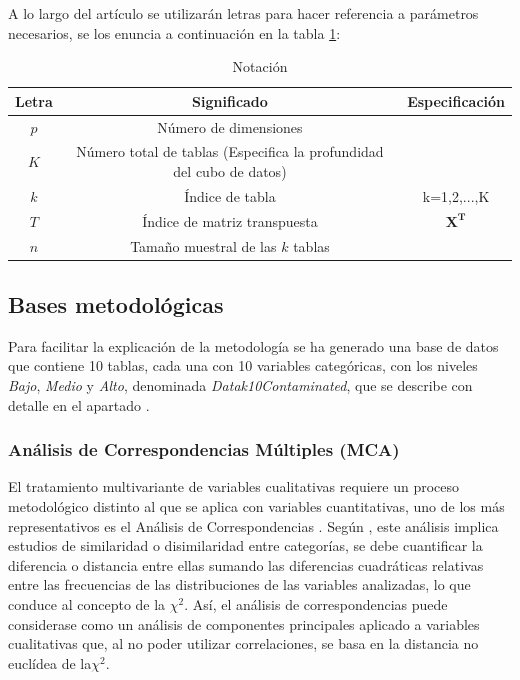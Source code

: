 \documentclass[mathematics,article,submit,moreauthors,pdftex]{mdpi}
\begin{document}
A lo largo del artículo se utilizarán letras para hacer referencia a
parámetros necesarios, se los enuncia a continuación en la tabla
\ref{tab:notacion2}:

\begin{table}[!ht]
\begin{center}
 \begin{tabular}{||c ||c | c ||} 
 \hline
 Letra &  Significado & Especificación\\
 \hline\hline
 $p$ & Número de dimensiones &\\
\hline
 $K$ & Número total de tablas (Especifica la profundidad del cubo de datos) & \\
 \hline
 $k$ & Índice de tabla &  k=1,2,...,K\\
  \hline
 $T$ & Índice de matriz transpuesta &  $\mathbf{X^{T}}$\\
\hline
 $n$ & Tamaño muestral de las $k$ tablas &\\
\hline
\end{tabular}\caption{Notación}
\label{tab:notacion2}
\end{center}
\end{table}

\hypertarget{bases-metodoluxf3gicas}{%
\subsection{Bases metodológicas}\label{bases-metodoluxf3gicas}}

Para facilitar la explicación de la metodología se ha generado una base
de datos que contiene 10 tablas, cada una con 10 variables categóricas,
con los niveles \emph{Bajo}, \emph{Medio} y \emph{Alto}, denominada
\emph{Datak10Contaminated}, que se describe con detalle en el apartado
.

\hypertarget{anuxe1lisis-de-correspondencias-muxfaltiples-mca}{%
\subsubsection{Análisis de Correspondencias Múltiples
(MCA)}\label{anuxe1lisis-de-correspondencias-muxfaltiples-mca}}

El tratamiento multivariante de variables cualitativas requiere un
proceso metodológico distinto al que se aplica con variables
cuantitativas, uno de los más representativos es el Análisis de
Correspondencias \citep{Benzecri}. Según \citet{perez2004}, este
análisis implica estudios de similaridad o disimilaridad entre
categorías, se debe cuantificar la diferencia o distancia entre ellas
sumando las diferencias cuadráticas relativas entre las frecuencias de
las distribuciones de las variables analizadas, lo que conduce al
concepto de la \(\chi^2\). Así, el análisis de correspondencias puede
considerase como un análisis de componentes principales aplicado a
variables cualitativas que, al no poder utilizar correlaciones, se basa
en la distancia no euclídea de la\(\chi^2\).
\end{document}
